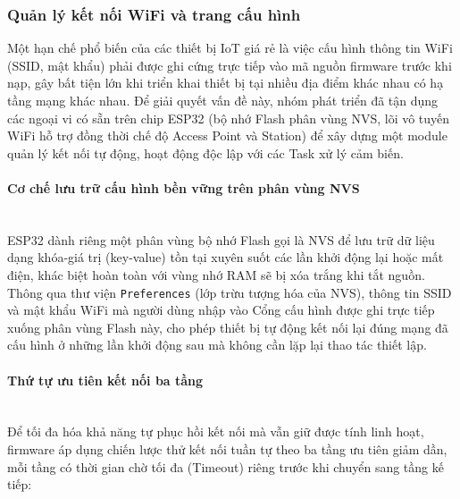 \documentclass[12pt,a4paper]{article}
\begin{document}
\subsubsection{Quản lý kết nối WiFi và trang cấu hình}

Một hạn chế phổ biến của các thiết bị IoT giá rẻ là việc cấu hình thông tin WiFi (SSID, mật khẩu) phải được ghi cứng trực tiếp vào mã nguồn firmware trước khi nạp, gây bất tiện lớn khi triển khai thiết bị tại nhiều địa điểm khác nhau có hạ tầng mạng khác nhau. Để giải quyết vấn đề này, nhóm phát triển đã tận dụng các ngoại vi có sẵn trên chip ESP32 (bộ nhớ Flash phân vùng NVS, lõi vô tuyến WiFi hỗ trợ đồng thời chế độ Access Point và Station) để xây dựng một module quản lý kết nối tự động, hoạt động độc lập với các Task xử lý cảm biến.

\paragraph{Cơ chế lưu trữ cấu hình bền vững trên phân vùng NVS}\mbox{}\\
ESP32 dành riêng một phân vùng bộ nhớ Flash gọi là NVS để lưu trữ dữ liệu dạng khóa-giá trị (key-value) tồn tại xuyên suốt các lần khởi động lại hoặc mất điện, khác biệt hoàn toàn với vùng nhớ RAM sẽ bị xóa trắng khi tắt nguồn. Thông qua thư viện \texttt{Preferences} (lớp trừu tượng hóa của NVS), thông tin SSID và mật khẩu WiFi mà người dùng nhập vào Cổng cấu hình được ghi trực tiếp xuống phân vùng Flash này, cho phép thiết bị tự động kết nối lại đúng mạng đã cấu hình ở những lần khởi động sau mà không cần lặp lại thao tác thiết lập.

\paragraph{Thứ tự ưu tiên kết nối ba tầng}\mbox{}\\
Để tối đa hóa khả năng tự phục hồi kết nối mà vẫn giữ được tính linh hoạt, firmware áp dụng chiến lược thử kết nối tuần tự theo ba tầng ưu tiên giảm dần, mỗi tầng có thời gian chờ tối đa (Timeout) riêng trước khi chuyển sang tầng kế tiếp:
\end{document}
